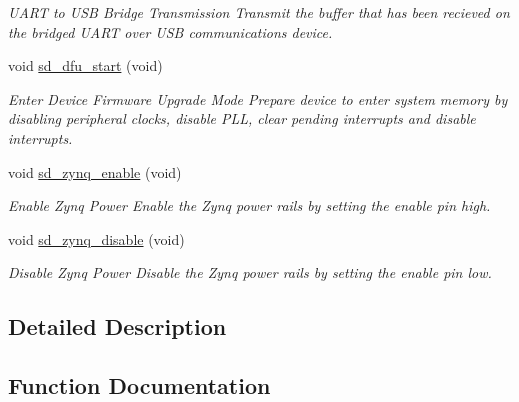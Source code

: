 \begin{DoxyCompactItemize}
\begin{DoxyCompactList}\small\item\em U\+A\+RT to U\+SB Bridge Transmission Transmit the buffer that has been recieved on the bridged U\+A\+RT over U\+SB communications device. \end{DoxyCompactList}\item 
void \mbox{\hyperlink{group___s_d___platform___function___declarations_ga405f1d2a69e1cf1f3d1ddbcbc3063651}{sd\+\_\+dfu\+\_\+start}} (void)
\begin{DoxyCompactList}\small\item\em Enter Device Firmware Upgrade Mode Prepare device to enter system memory by disabling peripheral clocks, disable P\+LL, clear pending interrupts and disable interrupts. \end{DoxyCompactList}\item 
void \mbox{\hyperlink{group___s_d___platform___function___declarations_gac30b9aa0032a9a8598735242c7cfa5bc}{sd\+\_\+zynq\+\_\+enable}} (void)
\begin{DoxyCompactList}\small\item\em Enable Zynq Power Enable the Zynq power rails by setting the enable pin high. \end{DoxyCompactList}\item 
void \mbox{\hyperlink{group___s_d___platform___function___declarations_gaaaa432cbbf3382d321107a38a56b9bef}{sd\+\_\+zynq\+\_\+disable}} (void)
\begin{DoxyCompactList}\small\item\em Disable Zynq Power Disable the Zynq power rails by setting the enable pin low. \end{DoxyCompactList}\end{DoxyCompactItemize}


\subsection{Detailed Description}


\subsection{Function Documentation}
\mbox{\label{group___s_d___platform___function___declarations_ga5901d51fd6320b6f45c3de9e910ef765}} 

